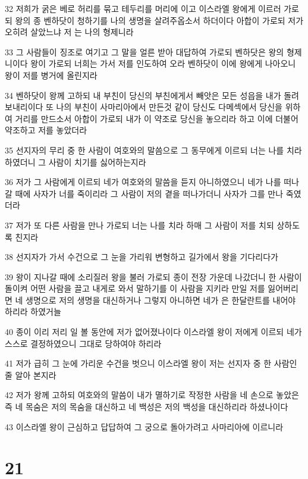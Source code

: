 \par 32 저희가 굵은 베로 허리를 묶고 테두리를 머리에 이고 이스라엘 왕에게 이르러 가로되 왕의 종 벤하닷이 청하기를 나의 생명을 살려주옵소서 하더이다 아합이 가로되 저가 오히려 살았느냐 저 는 나의 형제니라
\par 33 그 사람들이 징조로 여기고 그 말을 얼른 받아 대답하여 가로되 벤하닷은 왕의 형제니이다 왕이 가로되 너희는 가서 저를 인도하여 오라 벤하닷이 이에 왕에게 나아오니 왕이 저를 병거에 올린지라
\par 34 벤하닷이 왕께 고하되 내 부친이 당신의 부친에게서 빼앗은 모든 성읍을 내가 돌려 보내리이다 또 나의 부친이 사마리아에서 만든것 같이 당신도 다메섹에서 당신을 위하여 거리를 만드소서 아합이 가로되 내가 이 약조로 당신을 놓으리라 하고 이에 더불어 약조하고 저를 놓았더라
\par 35 선지자의 무리 중 한 사람이 여호와의 말씀으로 그 동무에게 이르되 너는 나를 치라 하였더니 그 사람이 치기를 싫어하는지라
\par 36 저가 그 사람에게 이르되 네가 여호와의 말씀을 듣지 아니하였으니 네가 나를 떠나갈 때에 사자가 너를 죽이리라 그 사람이 저의 곁을 떠나가더니 사자가 그를 만나 죽였더라
\par 37 저가 또 다른 사람을 만나 가로되 너는 나를 치라 하매 그 사람이 저를 치되 상하도록 친지라
\par 38 선지자가 가서 수건으로 그 눈을 가리워 변형하고 길가에서 왕을 기다리다가
\par 39 왕이 지나갈 때에 소리질러 왕을 불러 가로되 종이 전장 가운데 나갔더니 한 사람이 돌이켜 어떤 사람을 끌고 내게로 와서 말하기를 이 사람을 지키라 만일 저를 잃어버리면 네 생명으로 저의 생명을 대신하거나 그렇지 아니하면 네가 은 한달란트를 내어야 하리라 하였거늘
\par 40 종이 이리 저리 일 볼 동안에 저가 없어졌나이다 이스라엘 왕이 저에게 이르되 네가 스스로 결정하였으니 그대로 당하여야 하리라
\par 41 저가 급히 그 눈에 가리운 수건을 벗으니 이스라엘 왕이 저는 선지자 중 한 사람인 줄 알아 본지라
\par 42 저가 왕께 고하되 여호와의 말씀이 내가 멸하기로 작정한 사람을 네 손으로 놓았은즉 네 목숨은 저의 목숨을 대신하고 네 백성은 저의 백성을 대신하리라 하셨나이다
\par 43 이스라엘 왕이 근심하고 답답하여 그 궁으로 돌아가려고 사마리아에 이르니라

\chapter{21}

